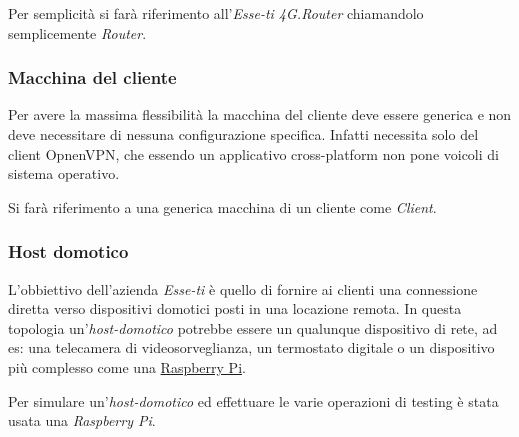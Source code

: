 Per semplicità si farà riferimento all'\textit{Esse-ti 4G.Router} chiamandolo semplicemente \textit{Router}.

\subsubsection{Macchina del cliente \ok}
\label{subsec:macchina-cliente}

Per avere la massima flessibilità la macchina del cliente deve essere generica e non deve necessitare di nessuna configurazione specifica. Infatti necessita solo del client OpnenVPN, che essendo un applicativo cross-platform non pone voicoli di sistema operativo.

Si farà riferimento a una generica macchina di un cliente come \textit{Client}.

\newpage
\subsubsection{Host domotico \ok}

L'obbiettivo dell'azienda \textit{Esse-ti} è quello di fornire ai clienti una connessione diretta verso dispositivi domotici posti in una locazione remota. In questa topologia un'\textit{host-domotico} potrebbe essere un qualunque dispositivo di rete, ad es: una telecamera di videosorveglianza, un termostato digitale o un dispositivo più complesso come una \href{https://en.wikipedia.org/wiki/Raspberry_Pi}{Raspberry Pi}.

Per simulare un'\textit{host-domotico} ed effettuare le varie operazioni di testing è stata usata una \textit{Raspberry Pi}.


